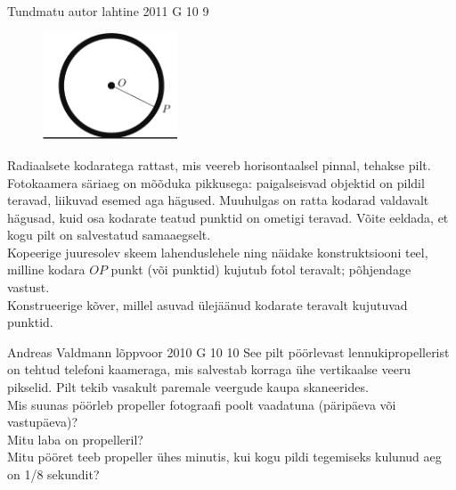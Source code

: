 \documentclass[11pt, twoside]{article}
\begin{document}
{%
{Tundmatu autor} %
{lahtine} %
{2011} %
{G 10} %
{9} %
{
\ifStatement
\begin{figure}
	\vspace{-10pt}
	\includegraphics[width=40mm]{2011-lahg-10-kodar.pdf}
\end{figure}
Radiaalsete kodaratega rattast, mis veereb horisontaalsel pinnal, tehakse pilt.
Fotokaamera säriaeg on mõõduka pikkusega: paigalseisvad objektid on pildil teravad, 
liikuvad esemed aga hägused. Muuhulgas on ratta kodarad valdavalt hägusad, 
kuid osa kodarate teatud punktid on ometigi teravad. Võite eeldada, et kogu pilt on 
salvestatud samaaegselt. 
\\
\osa Kopeerige juuresolev skeem lahenduslehele ning näidake konstruktsiooni teel, 
milline kodara $OP$ punkt (või punktid) kujutub fotol teravalt; põhjendage vastust.\\
\osa Konstrueerige kõver, millel asuvad ülejäänud kodarate teravalt kujutuvad punktid.
\fi
}

{Andreas Valdmann} %
{lõppvoor} %
{2010} %
{G 10} %
{10} %
{
\ifStatement
See pilt pöörlevast lennukipropellerist on tehtud telefoni kaameraga, mis salvestab korraga ühe vertikaalse veeru pikselid. Pilt tekib vasakult paremale veergude kaupa skaneerides.\\
\osa Mis suunas pöörleb propeller fotograafi poolt vaadatuna (päripäeva või vastupäeva)?\\
\osa Mitu laba on propelleril?\\
\osa Mitu pööret teeb propeller ühes minutis, kui kogu pildi tegemiseks kulunud aeg on 1/8 sekundit?\\

}}
\end{document}
